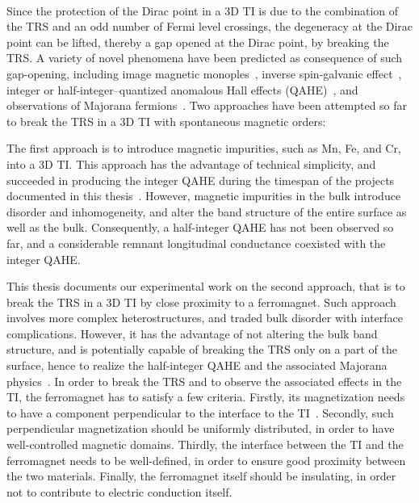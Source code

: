 \paragraph{}
Since the protection of the Dirac point in a 3D TI is due to the combination of the TRS and an odd number of Fermi level crossings, the degeneracy at the Dirac point can be lifted, thereby a gap opened at the Dirac point, by breaking the TRS. A variety of novel phenomena have been predicted as consequence of such gap-opening, including image magnetic monoples~\cite{TI_birth, TI_monopole}, inverse spin-galvanic effect~\cite{ISG}, integer or half-integer--quantized anomalous Hall effects (QAHE)~\cite{TI_Col, QAH_TI_Yu}, and observations of Majorana fermions~\cite{TI_Qi, TI_Col}. Two approaches have been attempted so far to break the TRS in a 3D TI with spontaneous magnetic orders:

The first approach is to introduce magnetic impurities, such as Mn, Fe, and Cr, into a 3D TI. This approach has the advantage of technical simplicity, and succeeded in producing the integer QAHE during the timespan of the projects documented in this thesis~\cite{Chang2013, Kou2014}. However, magnetic impurities in the bulk introduce disorder and inhomogeneity, and alter the band structure of the entire surface as well as the bulk. Consequently, a half-integer QAHE has not been observed so far, and a considerable remnant longitudinal conductance coexisted with the integer QAHE.

This thesis documents our experimental work on the second approach, that is to break the TRS in a 3D TI by close proximity to a ferromagnet. Such approach involves more complex heterostructures, and traded bulk disorder with interface complications. However, it has the advantage of not altering the bulk band structure, and is potentially capable of breaking the TRS only on a part of the surface, hence to realize the half-integer QAHE and the associated Majorana physics~\cite{TI_Qi, TI_Col}. In order to break the TRS and to observe the associated effects in the TI, the ferromagnet has to satisfy a few criteria. Firstly, its magnetization needs to have a component perpendicular to the interface to the TI~\cite{MnSe}. Secondly, such perpendicular magnetization should be uniformly distributed, in order to have well-controlled magnetic domains. Thirdly, the interface between the TI and the ferromagnet needs to be well-defined, in order to ensure good proximity between the two materials. Finally, the ferromagnet itself should be insulating, in order not to contribute to electric conduction itself.

